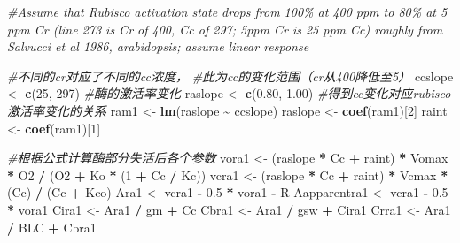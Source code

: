 \documentclass[
]{krantz}
\makeatletter
\newenvironment{Shaded}{\begin{snugshade}}{\end{snugshade}}
\newcommand{\CommentTok}[1]{\textcolor[rgb]{0.56,0.35,0.01}{\textit{#1}}}
\newcommand{\DecValTok}[1]{\textcolor[rgb]{0.00,0.00,0.81}{#1}}
\newcommand{\FloatTok}[1]{\textcolor[rgb]{0.00,0.00,0.81}{#1}}
\newcommand{\KeywordTok}[1]{\textcolor[rgb]{0.13,0.29,0.53}{\textbf{#1}}}
\newcommand{\NormalTok}[1]{#1}
\newcommand{\OperatorTok}[1]{\textcolor[rgb]{0.81,0.36,0.00}{\textbf{#1}}}
\newcommand{\StringTok}[1]{\textcolor[rgb]{0.31,0.60,0.02}{#1}}
\newenvironment{kframe}{%
\medskip{}
\setlength{\fboxsep}{.8em}
 \def\at@end@of@kframe{}%
 \ifinner\ifhmode%
  \def\at@end@of@kframe{\end{minipage}}%
  \begin{minipage}{\columnwidth}%
 \fi\fi%
 \def\FrameCommand##1{\hskip\@totalleftmargin \hskip-\fboxsep
 \colorbox{shadecolor}{##1}\hskip-\fboxsep
     \hskip-\linewidth \hskip-\@totalleftmargin \hskip\columnwidth}%
 \MakeFramed {\advance\hsize-\width
   \@totalleftmargin\z@ \linewidth\hsize
   \@setminipage}}%
 {\par\unskip\endMakeFramed%
 \at@end@of@kframe}
\renewenvironment{Shaded}{\begin{kframe}}{\end{kframe}}
\makeatother
\begin{document}
\begin{Shaded}
\begin{Highlighting}[]
\CommentTok{\#Assume that Rubisco activation state drops from 100\% at 400 ppm to 80\% at 5 ppm Cr (line 273 is Cr of 400, Cc of 297; 5ppm Cr is 25 ppm Cc) roughly from Salvucci et al 1986, arabidopsis; assume linear response}

\CommentTok{\#不同的cr对应了不同的cc浓度，}
\CommentTok{\#此为cc的变化范围（cr从400降低至5）}
\NormalTok{ccslope \textless{}{-}}\StringTok{ }\KeywordTok{c}\NormalTok{(}\DecValTok{25}\NormalTok{, }\DecValTok{297}\NormalTok{)}
\CommentTok{\#酶的激活率变化}
\NormalTok{raslope \textless{}{-}}\StringTok{ }\KeywordTok{c}\NormalTok{(}\FloatTok{0.80}\NormalTok{, }\FloatTok{1.00}\NormalTok{)}
\CommentTok{\#得到cc变化对应rubisco激活率变化的关系}
\NormalTok{ram1 \textless{}{-}}\StringTok{ }\KeywordTok{lm}\NormalTok{(raslope }\OperatorTok{\textasciitilde{}}\StringTok{ }\NormalTok{ccslope)}
\NormalTok{raslope \textless{}{-}}\StringTok{ }\KeywordTok{coef}\NormalTok{(ram1)[}\DecValTok{2}\NormalTok{]}
\NormalTok{raint \textless{}{-}}\StringTok{ }\KeywordTok{coef}\NormalTok{(ram1)[}\DecValTok{1}\NormalTok{]}

\CommentTok{\#根据公式计算酶部分失活后各个参数}
\NormalTok{vora1 \textless{}{-}}\StringTok{ }\NormalTok{(raslope }\OperatorTok{*}\StringTok{ }\NormalTok{Cc }\OperatorTok{+}\StringTok{ }\NormalTok{raint) }\OperatorTok{*}\StringTok{ }\NormalTok{Vomax }\OperatorTok{*}\StringTok{ }\NormalTok{O2 }\OperatorTok{/}\StringTok{ }\NormalTok{(O2 }\OperatorTok{+}\StringTok{ }\NormalTok{Ko }\OperatorTok{*}\StringTok{ }\NormalTok{(}\DecValTok{1} \OperatorTok{+}\StringTok{ }\NormalTok{Cc }\OperatorTok{/}\StringTok{ }\NormalTok{Kc))}
\NormalTok{vcra1 \textless{}{-}}\StringTok{ }\NormalTok{(raslope }\OperatorTok{*}\StringTok{ }\NormalTok{Cc }\OperatorTok{+}\StringTok{ }\NormalTok{raint) }\OperatorTok{*}\StringTok{ }\NormalTok{Vcmax }\OperatorTok{*}\StringTok{ }\NormalTok{(Cc) }\OperatorTok{/}\StringTok{ }\NormalTok{(Cc }\OperatorTok{+}\StringTok{ }\NormalTok{Kco)}
\NormalTok{Ara1 \textless{}{-}}\StringTok{ }\NormalTok{vcra1 }\OperatorTok{{-}}\StringTok{ }\FloatTok{0.5} \OperatorTok{*}\StringTok{ }\NormalTok{vora1 }\OperatorTok{{-}}\StringTok{ }\NormalTok{R}
\NormalTok{Aapparentra1 \textless{}{-}}\StringTok{ }\NormalTok{vcra1 }\OperatorTok{{-}}\StringTok{ }\FloatTok{0.5} \OperatorTok{*}\StringTok{ }\NormalTok{vora1}
\NormalTok{Cira1 \textless{}{-}}\StringTok{ }\NormalTok{Ara1 }\OperatorTok{/}\StringTok{ }\NormalTok{gm }\OperatorTok{+}\StringTok{ }\NormalTok{Cc}
\NormalTok{Cbra1 \textless{}{-}}\StringTok{ }\NormalTok{Ara1 }\OperatorTok{/}\StringTok{ }\NormalTok{gsw }\OperatorTok{+}\StringTok{ }\NormalTok{Cira1}
\NormalTok{Crra1 \textless{}{-}}\StringTok{ }\NormalTok{Ara1 }\OperatorTok{/}\StringTok{ }\NormalTok{BLC }\OperatorTok{+}\StringTok{ }\NormalTok{Cbra1}


\end{Highlighting}
\end{Shaded}
\end{document}

